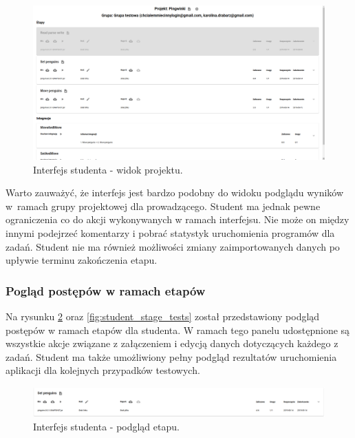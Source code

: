\begin{figure}[h]
    \centering
    \includegraphics[width = 15cm]{chapter04/student_project_board.png}
    \caption{Interfejs studenta - widok projektu.}
    \label{fig:student_project_board}
\end{figure}

Warto zauważyć, że interfejs jest bardzo podobny do widoku podglądu wyników w~ramach grupy projektowej dla prowadzącego.
Student ma jednak pewne ograniczenia co do akcji wykonywanych w ramach interfejsu.
Nie może on między innymi podejrzeć komentarzy i pobrać statystyk uruchomienia programów dla zadań.
Student nie ma również możliwości zmiany zaimportowanych danych po upływie terminu zakończenia etapu.

\subsubsection{Pogląd postępów w ramach etapów}

Na rysunku \ref{fig:student_stage} oraz \ref{fig:student_stage_tests} został przedstawiony podgląd postępów w ramach etapów dla studenta.
W ramach tego panelu udostępnione są wszystkie akcje związane z załączeniem i edycją danych dotyczących każdego z zadań.
Student ma także umożliwiony pełny podgląd rezultatów uruchomienia aplikacji dla kolejnych przypadków testowych.

\begin{figure}[h]
    \centering
    \includegraphics[width = 15cm]{chapter04/student_stage.png}
    \caption{Interfejs studenta - podgląd etapu.}
    \label{fig:student_stage}
\end{figure}


